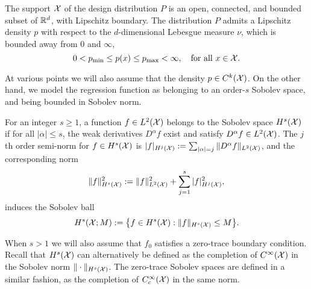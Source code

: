 \begin{definition}
	\label{def:model_flat_euclidean}
	The support $\mathcal{X}$ of the design distribution $P$ is an open, connected, and bounded subset of $\mathbb{R}^d$, with Lipschitz boundary. The distribution $P$ admits a Lipschitz density $p$ with respect to the $d$-dimensional Lebesgue measure $\nu$, which is bounded away from $0$ and $\infty$,
	\begin{equation*}
	0 < p_{\min} \leq p(x) \leq p_{\max} < \infty, \quad \textrm{for all $x \in \mathcal{X}$.}
	\end{equation*}
\end{definition}
At various points we will also assume that the density $p \in C^k(\mathcal{X})$. On the other hand, we model the regression function as belonging to an order-$s$ Sobolev space, and being bounded in Sobolev norm.
\begin{definition}
	\label{def:sobolev_space}
	For an integer $s \geq 1$, a function $f \in L^2(\mathcal{X})$ belongs to the Sobolev space $H^s(\mathcal{X})$ if for all $|\alpha| \leq s$, the weak derivatives $D^{\alpha}f$ exist and satisfy $D^{\alpha}f \in L^2(\mathcal{X})$. The $j$th order semi-norm for $f \in H^s(\mathcal{X})$ is $|f|_{H^j(\mathcal{X})} := \sum_{|\alpha| = j}\|D^{\alpha}f\|_{L^2(\mathcal{X})}$, and the corresponding norm
	\begin{equation*}
	\|f\|_{H^s(\mathcal{X})}^2 := \|f\|_{L^2(\mathcal{X})}^2 + \sum_{j = 1}^{s} |f|_{H^j(\mathcal{X})}^2,
	\end{equation*}
	induces the Sobolev ball
	\begin{equation*}
	H^s(\mathcal{X};M) := \bigl\{f \in H^s(\mathcal{X}): \|f\|_{H^s(\mathcal{X})} \leq M\bigr\}.
	\end{equation*} 
\end{definition}
When $s > 1$ we will also assume that $f_0$ satisfies a zero-trace boundary condition. Recall that $H^s(\mathcal{X})$ can alternatively be defined as the completion of $C^{\infty}(\mathcal{X})$ in the Sobolev norm $\|\cdot\|_{H^s(\mathcal{X})}$. The zero-trace Sobolev spaces are defined in a similar fashion, as the completion of $C_c^{\infty}(\mathcal{X})$ in the same norm.

